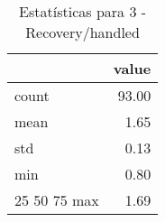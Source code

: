 \begin{table}[htbp]
\caption{Estatísticas para 3 - Recovery/handled}
\label{tab:3_-_recovery_handled_summary}
\begin{tabular}{lr}
\toprule
 & value \\
\midrule
count & 93.00 \\
mean & 1.65 \\
std & 0.13 \\
min & 0.80 \\
25%
50%
75%
max & 1.69 \\
\bottomrule
\end{tabular}
\end{table}
